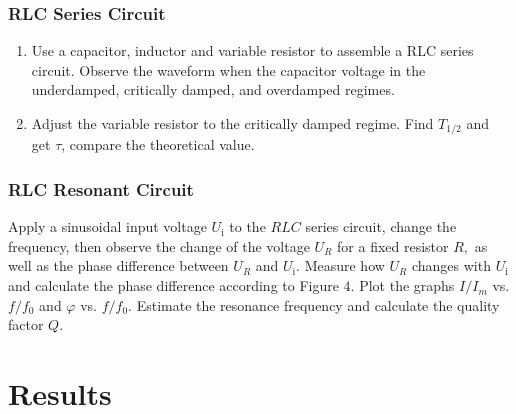 \documentclass[12pt,a4paper]{article}
\begin{document}
\subsubsection{RLC Series Circuit}
\begin{enumerate}[1.]
    \item Use a capacitor, inductor and variable resistor to assemble a RLC series circuit. Observe the waveform when the capacitor voltage in the underdamped,
    critically damped, and overdamped regimes.
    \item Adjust the variable resistor to the critically damped regime. Find $T_{1/2}$ and get $\tau$, compare the theoretical value.
\end{enumerate}
\subsubsection{RLC Resonant Circuit}
\qquad Apply a sinusoidal input voltage $U_{\mathrm{i}}$ to the $R L C$ series circuit, change the frequency, then observe the change of the voltage $U_{R}$ for a fixed resistor $R,$ as well as the phase difference between $U_{R}$ and $U_{\mathrm{i}}$. Measure how $U_{R}$ changes with $U_{\mathrm{i}}$ and calculate the phase difference according to Figure $4 .$ Plot the graphs $I / I_{m}$ vs. $f / f_{0}$ and $\varphi$ vs. $f / f_{0} .$ Estimate the resonance frequency and calculate the quality factor $Q$.

\section{Results}
\end{document}
